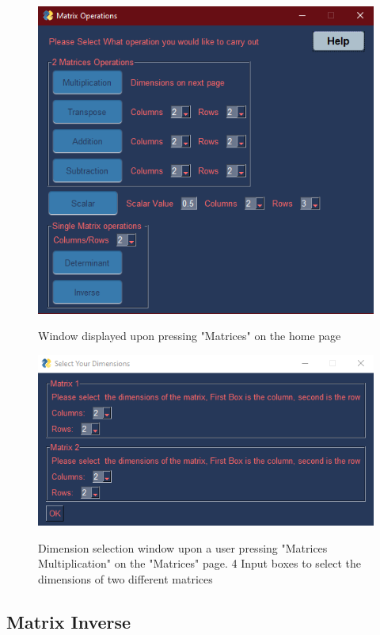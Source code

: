 \documentclass[final]{cmpreport}
\begin{document}
	\begin{figure}[H]
		\caption{Window displayed upon pressing "Matrices" on the home page}
		\centering
		\includegraphics[scale=1]{matrices.png}
		\label{fig:matrices}
	\end{figure}
	\begin{figure}[H]
	\caption{Dimension selection window upon a user pressing "Matrices Multiplication" on the "Matrices" page. 4 Input boxes to select the dimensions of two different matrices}
	\centering
	\includegraphics[scale=1]{dim.png}
	\label{fig:dimensions}
	\end{figure}
	
	\subsection{Matrix Inverse} \label{sec:inv}
	
\end{document}
